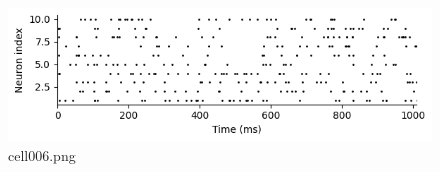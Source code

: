 \begin{figure}[ht]
	\centering
	\includegraphics[scale=0.8, max width=\linewidth]{./fig/neuron-model/isi/cell006.png}
	\caption{cell006.png}
	\label{cell006.png}
\end{figure}